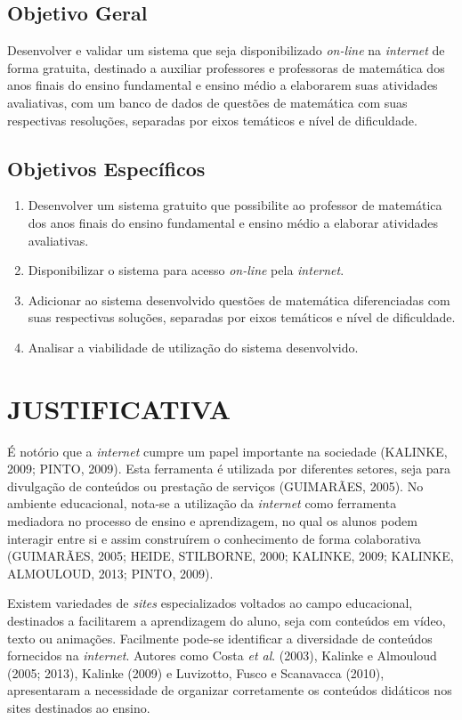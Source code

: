 \documentclass{IFNMG}
\begin{document}
\subsection{Objetivo Geral}
Desenvolver e validar um sistema que seja disponibilizado \textit{on-line} na \textit{internet} de forma gratuita, destinado a auxiliar professores e professoras de matemática dos anos finais do ensino fundamental e ensino médio a elaborarem suas atividades avaliativas, com um banco de dados de questões de matemática com suas respectivas resoluções, separadas por eixos temáticos e nível de dificuldade.  
\subsection{Objetivos Específicos}
\begin{enumerate}
	\item Desenvolver um sistema gratuito que possibilite ao  professor de matemática  dos anos finais do ensino fundamental e ensino médio a elaborar atividades avaliativas.
	\item Disponibilizar o sistema para acesso \textit{on-line} pela \textit{internet}.
	\item Adicionar ao sistema desenvolvido questões de matemática diferenciadas com suas respectivas soluções, separadas por eixos temáticos e nível de dificuldade.
	\item Analisar a viabilidade de utilização do sistema desenvolvido.
\end{enumerate}
\newpage
\section{JUSTIFICATIVA}
É notório que a \textit{internet} cumpre um papel importante na sociedade (KALINKE, 2009; PINTO, 2009). Esta ferramenta é utilizada por diferentes setores, seja para divulgação de conteúdos ou prestação de serviços (GUIMARÃES, 2005). No ambiente educacional, nota-se a utilização da \textit{internet} como ferramenta mediadora no processo de ensino e aprendizagem, no qual os alunos podem interagir entre si e assim construírem o conhecimento de forma colaborativa (GUIMARÃES, 2005; HEIDE, STILBORNE, 2000; KALINKE, 2009; KALINKE, ALMOULOUD, 2013; PINTO, 2009).

Existem variedades de \textit{sites} especializados voltados ao campo educacional, destinados a facilitarem a aprendizagem do aluno, seja com conteúdos em vídeo, texto ou animações. Facilmente pode-se identificar a diversidade de conteúdos fornecidos na \textit{internet}. Autores como Costa \textit{et al}. (2003),   Kalinke e Almouloud (2005; 2013), Kalinke (2009) e Luvizotto, Fusco e Scanavacca (2010), apresentaram a necessidade de organizar corretamente os conteúdos didáticos nos sites destinados ao ensino.
\end{document}

